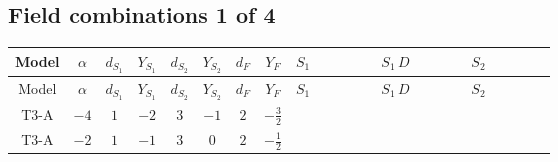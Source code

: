 \documentclass[8pt]{article}
\begin{document}
\begin{landscape}
\subsection*{Field combinations 1 of 4}
\begin{longtable}{@{}cccccccc >{\raggedright\arraybackslash}p{0.21\linewidth} >{\raggedright\arraybackslash}p{0.21\linewidth} >{\raggedright\arraybackslash}p{0.21\linewidth}@{}}
\toprule
Model & $\alpha$ & $d_{S_1}$ & $Y_{S_1}$ & $d_{S_2}$ & $Y_{S_2}$ & $d_F$ & $Y_F$ & $S_1$ & $S_1\,D$ & $S_2$ \\
\midrule
\endfirsthead
\toprule
Model & $\alpha$ & $d_{S_1}$ & $Y_{S_1}$ & $d_{S_2}$ & $Y_{S_2}$ & $d_F$ & $Y_F$ & $S_1$ & $S_1\,D$ & $S_2$ \\
\midrule
\endhead
T3-A & $-4$ & $1$ & $-2$ & $3$ & $-1$ & $2$ & $-\frac{3}{2}$ & \scriptsize\adjustbox{max width=\linewidth}{$\begin{gathered} -S_1 S_1{}^{\dagger } m_1^2 \\ +\frac{1}{2} S_1^2 \left(S_1{}^{\dagger }\right){}^2 \lambda_{S_1}^{(1)}\end{gathered}$} & \scriptsize\adjustbox{max width=\linewidth}{$\begin{gathered} +D_{\mu _1}\left(S_1\right){}^{\dagger } D_{\mu _1}\left(S_1\right)\end{gathered}$} & \scriptsize\adjustbox{max width=\linewidth}{$\begin{gathered} -m_2^2 S_{2,j_1} S_{2,j_1}{}^{\dagger } \\ +\frac{1}{2} S_{2,j_3} S_{2,j_4} S_{2,j_1}{}^{\dagger } S_{2,j_2}{}^{\dagger } \mathcal{I}_{S_2,j_1,j_3,j_2,j_4}{}^1 \lambda_{S_2}^{(1)} \\ +\frac{1}{2} S_{2,j_3} S_{2,j_4} S_{2,j_1}{}^{\dagger } S_{2,j_2}{}^{\dagger } \mathcal{I}_{S_2,j_1,j_3,j_2,j_4}{}^2 \lambda_{S_2}^{(2)}\end{gathered}$} \\
\midrule
T3-A & $-2$ & $1$ & $-1$ & $3$ & $0$ & $2$ & $-\frac{1}{2}$ & \scriptsize\adjustbox{max width=\linewidth}{$\begin{gathered} -S_1 S_1{}^{\dagger } m_1^2 \\ +\frac{1}{2} S_1^2 \left(S_1{}^{\dagger }\right){}^2 \lambda_{S_1}^{(1)}\end{gathered}$} & \scriptsize\adjustbox{max width=\linewidth}{$\begin{gathered} +D_{\mu _1}\left(S_1\right){}^{\dagger } D_{\mu _1}\left(S_1\right)\end{gathered}$} & \scriptsize\adjustbox{max width=\linewidth}{$\begin{gathered} -m_2^2 S_{2,j_1} S_{2,j_1}{}^{\dagger } \\ +\frac{1}{2} S_{2,j_3} S_{2,j_4} S_{2,j_1}{}^{\dagger } S_{2,j_2}{}^{\dagger } \mathcal{I}_{S_2,j_1,j_3,j_2,j_4}{}^1 \lambda_{S_2}^{(1)} \\ +\frac{1}{2} S_{2,j_3} S_{2,j_4} S_{2,j_1}{}^{\dagger } S_{2,j_2}{}^{\dagger } \mathcal{I}_{S_2,j_1,j_3,j_2,j_4}{}^2 \lambda_{S_2}^{(2)}\end{gathered}$} \\

\end{longtable}
\end{landscape}
\end{document}
